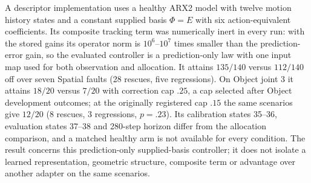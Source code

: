 A descriptor implementation uses a healthy ARX2 model with twelve motion
history states and a constant supplied basis $\Phi=E$ with six
action-equivalent coefficients. Its composite tracking term was numerically
inert in every run: with the stored gains its operator norm is $10^{6}$--$10^{7}$
times smaller than the prediction-error gain, so the evaluated controller is a
prediction-only law with one input map used for both observation and allocation.
It attains $135/140$ versus $112/140$ off over seven Spatial faults
(28 rescues, five regressions). On Object joint 3 it attains $18/20$ versus
$7/20$ with correction cap $.25$, a cap selected after Object development
outcomes; at the originally registered cap $.15$ the same scenarios give
$12/20$ (8 rescues, 3 regressions, $p=.23$). Its calibration states 35--36,
evaluation states 37--38 and 280-step horizon differ from the allocation
comparison, and a matched healthy arm is not available for every condition.
The result concerns this prediction-only supplied-basis controller; it does not
isolate a learned representation, geometric structure, composite term or
advantage over another adapter on the same scenarios.
